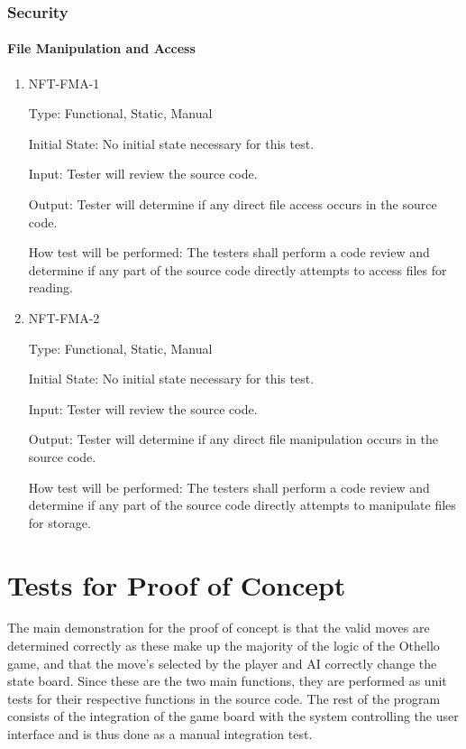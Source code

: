 \documentclass[12pt, titlepage]{article}
\begin{document}
\subsubsection{Security}

\paragraph{File Manipulation and Access}

\begin{enumerate}
	\item NFT-FMA-1

	      Type: Functional, Static, Manual

	      Initial State: No initial state necessary for this test.

	      Input: Tester will review the source code.

	      Output: Tester will determine if any direct file access occurs in the source code.

	      How test will be performed: The testers shall perform a code review and determine if any part of the source code directly attempts to access files for reading.
	\item NFT-FMA-2

	      Type: Functional, Static, Manual

	      Initial State: No initial state necessary for this test.

	      Input: Tester will review the source code.

	      Output: Tester will determine if any direct file manipulation occurs in the source code.

	      How test will be performed: The testers shall perform a code review and determine if any part of the source code directly attempts to manipulate files for storage.
\end{enumerate}

\section{Tests for Proof of Concept}
The main demonstration for the proof of concept is that the valid moves are determined correctly as these make up the majority of the logic of the Othello game, and that the move's selected by the player and AI correctly change the state board. Since these are the two main functions, they are performed as unit tests for their respective functions in the source code. The rest of the program consists of the integration of the game board with the system controlling the user interface and is thus done as a manual integration test.
\end{document}

